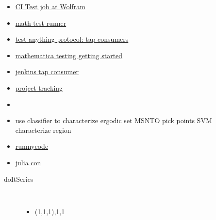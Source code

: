 \documentclass[hyperref]{labbook}
\begin{document}
  \begin{itemize}
  \item \href{https://www.wolfram.com/company/careers/opportunities/#op-94325-software-developer-in-test}{CI Test job at Wolfram}
  \item \href{https://github.com/lynchs61/Mathematica-Test-Runner}{math test runner}
  \item \href{https://testanything.org/consumers.html}{test anything protocol: tap consumers}
  \item \href{http://reference.wolfram.com/language/tutorial/UsingTheTestingFramework.html}{mathematica testing getting started}
  \item \href{https://wiki.jenkins.io/display/JENKINS/TAP+Plugin}{jenkins tap consumer }
  \item \href{https://www.atlassian.com/software/jira}{project tracking}
  \end{itemize}



\begin{itemize}
\item 
\end{itemize}

\begin{itemize}
\item use classifier to characterize ergodic set  MSNTO pick points SVM characterize region
\end{itemize}


\begin{itemize}
\item \href{http://www.runmycode.org/faq.html}{runmycode}
\item \href{http://juliacon.org/2018/cfp}{julia con}
\end{itemize}


\begin{description}
\item[doItSeries] \ 
  \begin{itemize}
  \item (1,1,1),1,1
  \end{itemize}
\end{description}
\end{document}
